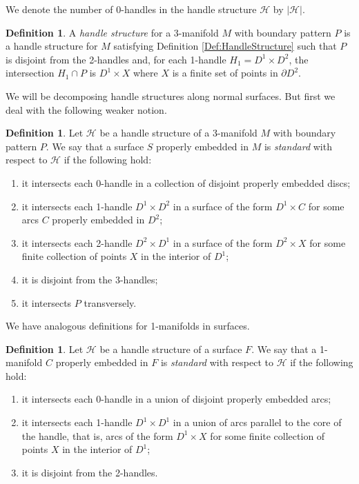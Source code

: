 \documentclass[oneside]{amsart}
\numberwithin{equation}{section}
\theoremstyle{plain}
\theoremstyle{definition}
\newtheorem{definition}[equation]{Definition}
\newcommand{\calH}{\mathcal{H}}
\begin{document}
We denote the number of 0-handles in the handle structure $\calH$ by $|\calH|$.

\begin{definition}
A \emph{handle structure} for a 3-manifold $M$ with boundary pattern $P$
is a handle structure for $M$ satisfying Definition \ref{Def:HandleStructure} such that $P$ is disjoint from the 2-handles
and, for each 1-handle $H_1 = D^1 \times D^2$, the intersection $H_1 \cap P$ is $D^1 \times X$
where $X$ is a finite set of points in $\partial D^2$.
\end{definition}

We will be decomposing handle structures along normal surfaces. But first we deal with 
the following weaker notion.

\begin{definition}
Let $\calH$ be a handle structure of a 3-manifold $M$ with boundary pattern $P$. We say that a surface $S$ properly embedded in $M$ is \emph{standard} with respect to $\calH$ if the following hold:
\begin{enumerate}
\item it intersects each 0-handle in a collection of disjoint properly embedded discs;
\item it intersects each 1-handle $D^1 \times D^2$ in a surface of the form $D^1 \times C$ for some arcs $C$ properly embedded in $D^2$;
\item it intersects each 2-handle $D^2 \times D^1$ in a surface of the form $D^2 \times X$ for some finite collection of points $X$ in the interior of $D^1$;
\item it is disjoint from the 3-handles;
\item it intersects $P$ transversely.
\end{enumerate}
\end{definition}


We have analogous definitions for 1-manifolds in surfaces.

\begin{definition}
Let $\calH$ be a handle structure of a surface $F$. We say that a 1-manifold $C$ properly embedded in $F$ is \emph{standard} with respect to $\calH$ if the following hold:
\begin{enumerate}
\item it intersects each 0-handle in a union of disjoint properly embedded arcs;
\item it intersects each 1-handle $D^1 \times D^1$ in a union of arcs parallel to the core of the handle, that is, arcs of the form $D^1 \times X$ for some finite collection of points $X$ in the interior of $D^1$;
\item it is disjoint from the 2-handles.
\end{enumerate}
\end{definition}
\end{document}
